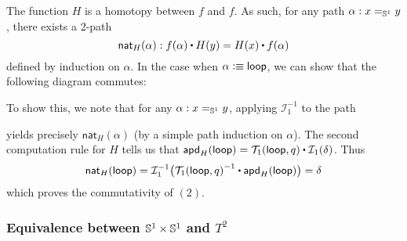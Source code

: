 \documentclass[
%
%
11pt %
]{article}
\newcommand{\nathom}[2]{\mathsf{nat}_{#1}(#2)}
\newcommand{\Tgh}[2]{\mathcal{T}_1(#1,#2)}
\newcommand{\I}{\mathcal{I}_1}
\begin{document}
The function $H$ is a homotopy between $f$ and $f$. As such, for any path $\alpha : x =_{\mathbb{S}^1} y$, there exists a 2-path \[\nathom{H}{\alpha} : \ap{f}{\alpha} \ct H(y)  = H(x) \ct \ap{f}{\alpha}\] defined by induction on $\alpha$. In the case when $\alpha \vcentcolon\equiv \mathsf{loop}$, we can show that the following diagram commutes:
\begin{center}
\end{center}
To show this, we note that for any $\alpha : x =_{\mathbb{S}^1} y$, applying $\I^{-1}$ to the path
\begin{center}
\end{center}
yields precisely $\nathom{H}{\alpha}$ (by a simple path induction on $\alpha$). The second computation rule for $H$ tells us that $\mapdep{H}{\lloop} = \Tgh{\lloop}{q} \ct \I(\delta)$. Thus
\[\nathom{H}{\lloop} = \I^{-1}\big(\opp{\Tgh{\lloop}{q}} \ct \mapdep{H}{\lloop}\big) = \delta \]
which proves the commutativity of $(2)$.

\subsubsection*{Equivalence between $\mathbb{S}^1 \times \mathbb{S}^1$ and $T^2$}
\end{document}
